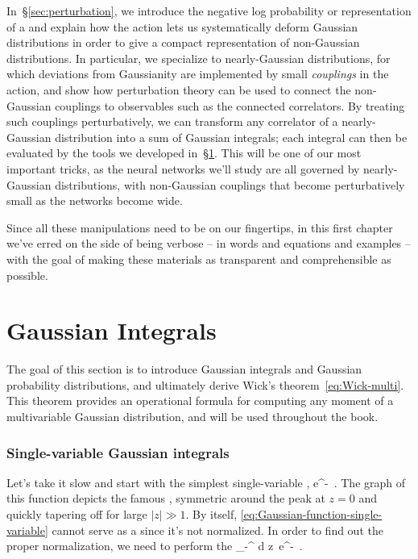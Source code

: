 In~\S\ref{sec:perturbation}, we introduce the negative log probability or  representation of a  and explain how the action lets us systematically deform Gaussian distributions in order to give a compact representation of non-Gaussian distributions. In particular, we specialize to nearly-Gaussian distributions, for which deviations from Gaussianity are implemented by small \emph{couplings} in the action, and show how perturbation theory can be used to connect the non-Gaussian couplings to observables such as the connected correlators.
By treating such couplings perturbatively, we can transform any correlator of a nearly-Gaussian distribution into a sum of
Gaussian integrals; each integral can then be evaluated by the tools we developed in~\S\ref{sec:Gauss}.
This will be one of our most important tricks, as the neural networks we'll study are all governed by nearly-Gaussian distributions, with non-Gaussian couplings that become perturbatively small as the networks become wide.

Since all these manipulations need to be on our fingertips, in this first chapter we've erred on the side of being verbose -- in words and equations and examples -- 
with the goal of making these materials as transparent and comprehensible as possible.









\section{Gaussian Integrals}\label{sec:Gauss}
The goal of this section is to introduce Gaussian integrals and Gaussian probability distributions, and ultimately derive Wick's theorem~\eqref{eq:Wick-multi}. This theorem provides an operational formula for computing any moment of a multivariable Gaussian distribution, and will be used throughout the book.



\subsubsection{Single-variable Gaussian integrals}
Let's take it slow and start with the simplest single-variable , %
\be\label{eq:Gaussian-function-single-variable}
e^{-}\, .
\ee
The graph of this function depicts the famous , symmetric around the peak at $z=0$ and quickly tapering off for large $\vert z \vert\gg1$. By itself, \eqref{eq:Gaussian-function-single-variable} cannot serve as a  since it's not normalized. In order to find out the proper normalization, we need to perform the 
\be\label{eq:single-variable-gaussian}
 \equiv \int_{-\infty}^{\infty} d z\ e^{-}\, .
\ee

